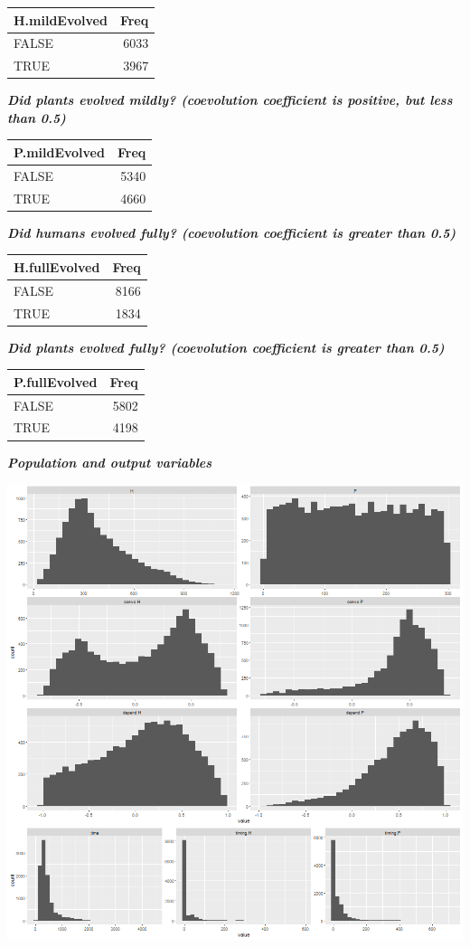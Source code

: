 \documentclass[
]{book}
\begin{document}
\begin{tabular}{l|r}
\hline
H.mildEvolved & Freq\\
\hline
FALSE & 6033\\
\hline
TRUE & 3967\\
\hline
\end{tabular}

\textbf{\emph{Did plants evolved mildly? (coevolution coefficient is positive, but less than 0.5)}}

\begin{tabular}{l|r}
\hline
P.mildEvolved & Freq\\
\hline
FALSE & 5340\\
\hline
TRUE & 4660\\
\hline
\end{tabular}

\textbf{\emph{Did humans evolved fully? (coevolution coefficient is greater than 0.5)}}

\begin{tabular}{l|r}
\hline
H.fullEvolved & Freq\\
\hline
FALSE & 8166\\
\hline
TRUE & 1834\\
\hline
\end{tabular}

\textbf{\emph{Did plants evolved fully? (coevolution coefficient is greater than 0.5)}}

\begin{tabular}{l|r}
\hline
P.fullEvolved & Freq\\
\hline
FALSE & 5802\\
\hline
TRUE & 4198\\
\hline
\end{tabular}

\textbf{\emph{Population and output variables}}

\includegraphics[width=1\linewidth]{plots/5_multiplePar-variables-ggplot}
\end{document}
